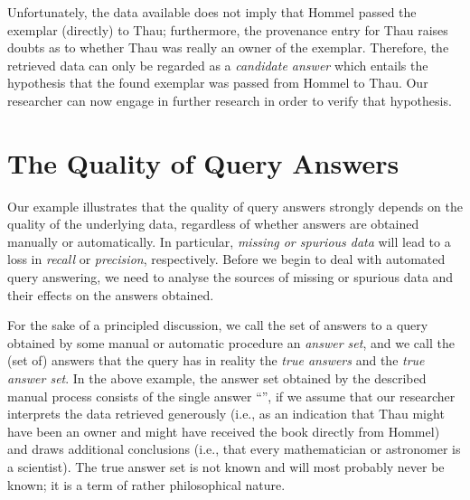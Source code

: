 Unfortunately, the data available does not imply that \foreignlanguage{ngerman}{Hommel} passed the exemplar (directly) to \foreignlanguage{ngerman}{Thau};
furthermore, the provenance entry for \foreignlanguage{ngerman}{Thau} raises doubts as to whether \foreignlanguage{ngerman}{Thau} was really an owner of the exemplar.
Therefore, the retrieved data can only be regarded as a \emph{candidate answer}
which entails the hypothesis that the found exemplar was passed from \foreignlanguage{ngerman}{Hommel} to \foreignlanguage{ngerman}{Thau}.
Our researcher can now engage in further research in order to verify that hypothesis.


\section{The Quality of Query Answers}
\label{sec:quality_of_answers}

Our example illustrates that the quality of query answers
strongly depends on the quality of the underlying data,
regardless of whether answers are obtained manually or automatically. 
In particular, \emph{missing or spurious data} will lead to 
a loss in \emph{recall} or \emph{precision}, respectively.
Before we begin to deal with automated query answering,
we need to analyse the sources of missing or spurious data and their effects on the answers obtained.

For the sake of a principled discussion, we call the set of answers to a query obtained by some manual or automatic procedure
an \emph{answer set}, and we call the (set of) answers that the query has in reality the \emph{true answers} and the \emph{true answer set}.
In the above example, the answer set obtained by the described manual process consists of the single answer
\enquote{}, if we assume that our researcher interprets the data retrieved generously
(i.e., as an indication that \foreignlanguage{ngerman}{Thau} might have been an owner and might have received the book directly from \foreignlanguage{ngerman}{Hommel})
and draws additional conclusions (i.e., that every mathematician or astronomer is a scientist).
The true answer set is not known and will most probably never be known; it is a term of rather philosophical nature.

